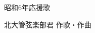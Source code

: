 \documentclass[10pt,b5j]{tarticle} %
\begin{document}
\begin{minipage}[c]{0.7\hsize} %
    \begin{center}
        {\LARGE
            昭和6年応援歌 %
        }
        {\small 
        }
    \end{center}
\end{minipage}
\begin{minipage}[c]{0.3\hsize} %
    \begin{flushright} %
        北大管弦楽部君 作歌・作曲 %
    \end{flushright}
\end{minipage}
\end{document}
